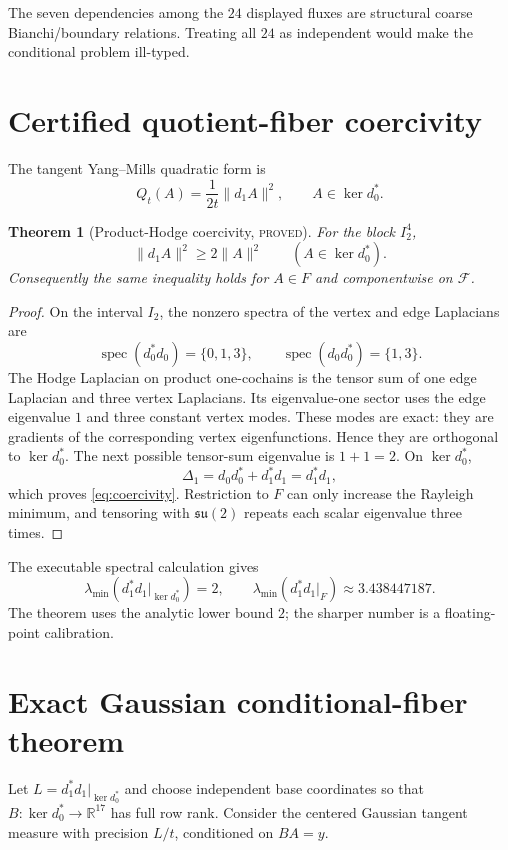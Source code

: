 \documentclass[11pt]{article}
\newcommand{\proved}{\textcolor{provedgreen}{\textsc{proved}}}
\newcommand{\R}{\mathbb R}
\newcommand{\spec}{\operatorname{spec}}
\newcommand{\su}{\mathfrak{su}(2)}
\newtheorem{theorem}[definition]{Theorem}
\theoremstyle{remark}
\begin{document}
The seven dependencies among the $24$ displayed fluxes are structural coarse
Bianchi/boundary relations.  Treating all $24$ as independent would make the
conditional problem ill-typed.

\section{Certified quotient-fiber coercivity}

The tangent Yang--Mills quadratic form is
\[
 Q_t(A)=\frac1{2t}\|d_1A\|^2,
 \qquad A\in\ker d_0^*.
\]

\begin{theorem}[Product-Hodge coercivity, \proved]\label{thm:hodge}
For the block $I_2^4$,
\begin{equation}\label{eq:coercivity}
 \|d_1A\|^2\ge2\|A\|^2
 \qquad(A\in\ker d_0^*).
\end{equation}
Consequently the same inequality holds for $A\in F$ and componentwise on
$\mathcal F$.
\end{theorem}
\begin{proof}
On the interval $I_2$, the nonzero spectra of the vertex and edge Laplacians
are
\[
 \spec(d_0^*d_0)=\{0,1,3\},
 \qquad \spec(d_0d_0^*)=\{1,3\}.
\]
The Hodge Laplacian on product one-cochains is the tensor sum of one edge
Laplacian and three vertex Laplacians.  Its eigenvalue-one sector uses the
edge eigenvalue $1$ and three constant vertex modes.  These modes are exact:
they are gradients of the corresponding vertex eigenfunctions.  Hence they
are orthogonal to $\ker d_0^*$.  The next possible tensor-sum eigenvalue is
$1+1=2$.  On $\ker d_0^*$,
\[
 \Delta_1=d_0d_0^*+d_1^*d_1=d_1^*d_1,
\]
which proves \eqref{eq:coercivity}.  Restriction to $F$ can only increase the
Rayleigh minimum, and tensoring with $\su$ repeats each scalar eigenvalue three
times.
\end{proof}

The executable spectral calculation gives
\[
 \lambda_{\min}(d_1^*d_1|_{\ker d_0^*})=2,
 \qquad
 \lambda_{\min}(d_1^*d_1|_F)\approx3.438447187.
\]
The theorem uses the analytic lower bound $2$; the sharper number is a
floating-point calibration.

\section{Exact Gaussian conditional-fiber theorem}

Let $L=d_1^*d_1|_{\ker d_0^*}$ and choose independent base coordinates so
that $B:\ker d_0^*\to\R^{17}$ has full row rank.  Consider the centered
Gaussian tangent measure with precision $L/t$, conditioned on $BA=y$.
\end{document}
